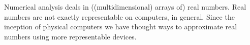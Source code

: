 Numerical analysis deals in ((multidimensional) arrays of) real numbers. Real
numbers are not exactly representable on computers, in
general\cite{turing-1936-7}. Since the inception of physical computers we have
thought ways to approximate real numbers using more representable devices.

\begin{thebibliography}{9}


\end{thebibliography}
